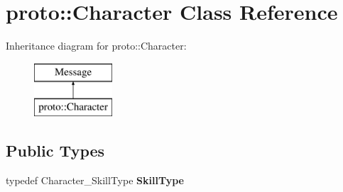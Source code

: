 \hypertarget{classproto_1_1_character}{}\section{proto\+:\+:Character Class Reference}
\label{classproto_1_1_character}
Inheritance diagram for proto\+:\+:Character\+:\begin{figure}[H]
\begin{center}
\leavevmode
\includegraphics[height=2.000000cm]{classproto_1_1_character}
\end{center}
\end{figure}
\subsection*{Public Types}
\begin{DoxyCompactItemize}
\item 
\hypertarget{classproto_1_1_character_a5c6311a2146a2470645d69fcd126165b}{}typedef Character\+\_\+\+Skill\+Type {\bfseries Skill\+Type}\label{classproto_1_1_character_a5c6311a2146a2470645d69fcd126165b}

\end{DoxyCompactItemize}
